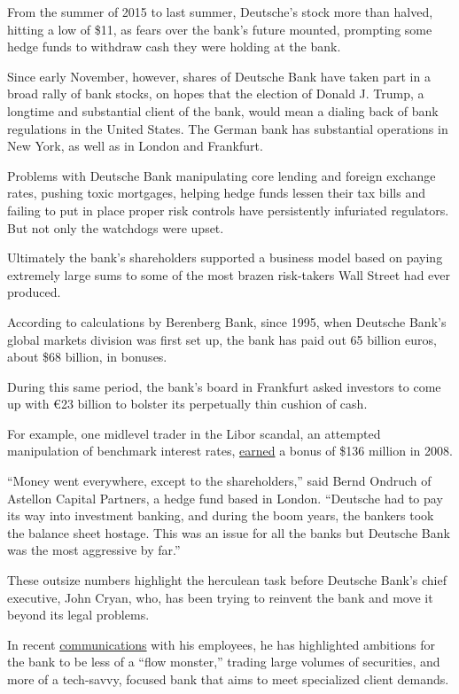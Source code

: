 From the summer of 2015 to last summer, Deutsche's stock more than
halved, hitting a low of \$11, as fears over the bank's future mounted,
prompting some hedge funds to withdraw cash they were holding at the
bank.

Since early November, however, shares of Deutsche Bank have taken part
in a broad rally of bank stocks, on hopes that the election of Donald J.
Trump, a longtime and substantial client of the bank, would mean a
dialing back of bank regulations in the United States. The German bank
has substantial operations in New York, as well as in London and
Frankfurt.

Problems with Deutsche Bank manipulating core lending and foreign
exchange rates, pushing toxic mortgages, helping hedge funds lessen
their tax bills and failing to put in place proper risk controls have
persistently infuriated regulators. But not only the watchdogs were
upset.

Ultimately the bank's shareholders supported a business model based on
paying extremely large sums to some of the most brazen risk-takers Wall
Street had ever produced.

According to calculations by Berenberg Bank, since 1995, when Deutsche
Bank's global markets division was first set up, the bank has paid out
65 billion euros, about \$68 billion, in bonuses.

During this same period, the bank's board in Frankfurt asked investors
to come up with €23 billion to bolster its perpetually thin cushion of
cash.

For example, one midlevel trader in the Libor scandal, an attempted
manipulation of benchmark interest rates,
\href{https://www.bloomberg.com/news/articles/2015-04-23/deutsche-bank-trader-bittar-s-libor-messages-revealed-by-u-s-}{earned}
a bonus of \$136 million in 2008.

``Money went everywhere, except to the shareholders,'' said Bernd
Ondruch of Astellon Capital Partners, a hedge fund based in London.
``Deutsche had to pay its way into investment banking, and during the
boom years, the bankers took the balance sheet hostage. This was an
issue for all the banks but Deutsche Bank was the most aggressive by
far.''

These outsize numbers highlight the herculean task before Deutsche
Bank's chief executive, John Cryan, who, has been trying to reinvent the
bank and move it beyond its legal problems.

In recent
\href{https://www.db.com/newsroom_news/2016/ghp/december-message-to-employees-from-john-cryan-en-11775.htm}{communications}
with his employees, he has highlighted ambitions for the bank to be less
of a ``flow monster,'' trading large volumes of securities, and more of
a tech-savvy, focused bank that aims to meet specialized client demands.

